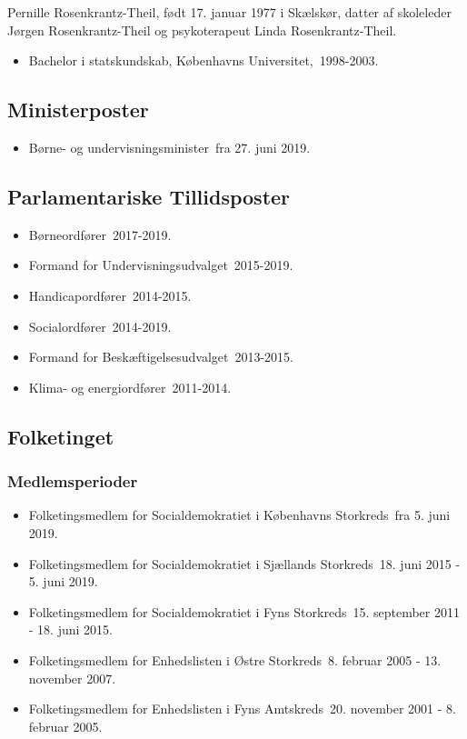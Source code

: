 \documentclass[11pt, a4paper]{awesome-cv}
\begin{document}
\makecvheader[R]
\makelettertitle
\begin{cvletter}
Pernille Rosenkrantz-Theil, født 17. januar 1977 i Skælskør, datter af skoleleder Jørgen Rosenkrantz-Theil og psykoterapeut Linda Rosenkrantz-Theil.

\begin{itemize}
\item Bachelor i statskundskab, Københavns Universitet, 1998-2003.
\end{itemize}
\subsection*{Ministerposter}
\begin{itemize}
\item Børne- og undervisningsminister fra 27. juni 2019.
\end{itemize}
\subsection*{Parlamentariske Tillidsposter}
\begin{itemize}
\item Børneordfører 2017-2019.
\item Formand for Undervisningsudvalget 2015-2019.
\item Handicapordfører 2014-2015.
\item Socialordfører 2014-2019.
\item Formand for Beskæftigelsesudvalget 2013-2015.
\item Klima- og energiordfører 2011-2014.
\end{itemize}
\subsection*{Folketinget}
\subsubsection*{Medlemsperioder}
\begin{itemize}
\item Folketingsmedlem for Socialdemokratiet i Københavns Storkreds fra 5. juni 2019.
\item Folketingsmedlem for Socialdemokratiet i Sjællands Storkreds 18. juni 2015 - 5. juni 2019.
\item Folketingsmedlem for Socialdemokratiet i Fyns Storkreds 15. september 2011 - 18. juni 2015.
\item Folketingsmedlem for Enhedslisten i Østre Storkreds 8. februar 2005 - 13. november 2007.
\item Folketingsmedlem for Enhedslisten i Fyns Amtskreds 20. november 2001 - 8. februar 2005.
\end{itemize}

\end{cvletter}
\end{document}
